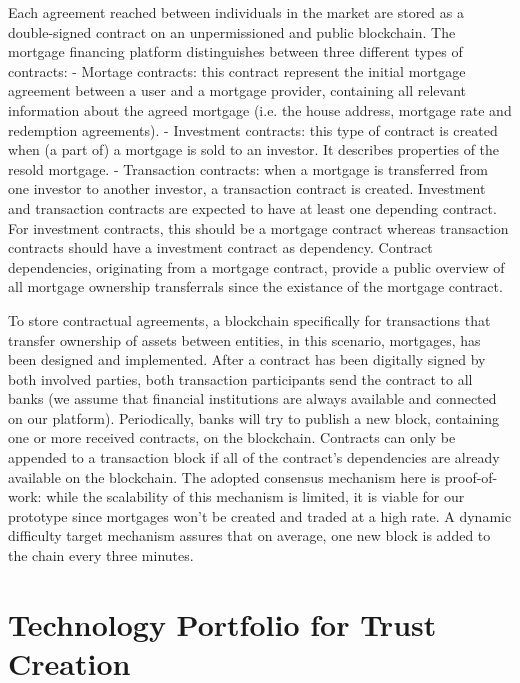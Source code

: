 \documentclass[USenglish]{article}
\begin{document}
Each agreement reached between individuals in the market are stored as a double-signed contract on an unpermissioned and public blockchain. The mortgage financing platform distinguishes between three different types of contracts:
- Mortage contracts: this contract represent the initial mortgage agreement between a user and a mortgage provider, containing all relevant information about the agreed mortgage (i.e. the house address, mortgage rate and redemption agreements).
- Investment contracts: this type of contract is created when (a part of) a mortgage is sold to an investor. It describes properties of the resold mortgage.
- Transaction contracts: when a mortgage is transferred from one investor to another investor, a transaction contract is created.
Investment and transaction contracts are expected to have at least one depending contract.
For investment contracts, this should be a mortgage contract whereas transaction contracts should have a investment contract as dependency.
Contract dependencies, originating from a mortgage contract, provide a public overview of all mortgage ownership transferrals since the existance of the mortgage contract.

To store contractual agreements, a blockchain specifically for transactions that transfer ownership of assets between entities, in this scenario, mortgages, has been designed and implemented.
After a contract has been digitally signed by both involved parties, both transaction participants send the contract to all banks (we assume that financial institutions are always available and connected on our platform).
Periodically, banks will try to publish a new block, containing one or more received contracts, on the blockchain.
Contracts can only be appended to a transaction block if all of the contract's dependencies are already available on the blockchain.
The adopted consensus mechanism here is proof-of-work: while the scalability of this mechanism is limited, it is viable for our prototype since mortgages won't be created and traded at a high rate.
A dynamic difficulty target mechanism assures that on average, one new block is added to the chain every three minutes.

\section{Technology Portfolio for Trust Creation}
\end{document}
